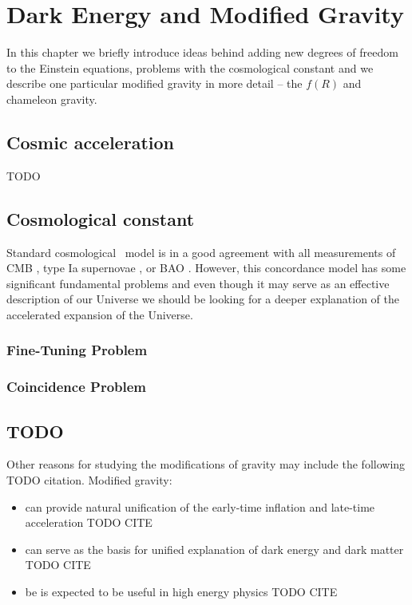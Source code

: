 \chapter{Dark Energy and Modified Gravity}
In this chapter we briefly introduce ideas behind adding new degrees of freedom to the Einstein equations, problems with the cosmological constant and we describe one particular modified gravity in more detail -- the $f(R)$ and chameleon gravity.
\section{Cosmic acceleration}
TODO

\section{Cosmological constant}
Standard cosmological \LCDM\ model is in a good agreement with all measurements of CMB \parencite{collaboration2018planck}, type Ia supernovae \parencite{Abbott_2019}, or BAO \parencite{BAO_results}. However, this concordance model has some significant fundamental problems and even though it may serve as an effective description of our Universe we should be looking for a deeper explanation of the accelerated expansion of the Universe.
\subsection{Fine-Tuning Problem}
\subsection{Coincidence Problem}

\section{TODO}
Other reasons for studying the modifications of gravity may include the following TODO citation. Modified gravity:
\begin{itemize}
	\item can provide natural unification of the early-time inflation and late-time acceleration TODO CITE
	\item can serve as the basis for unified explanation of dark energy and dark matter TODO CITE
	\item be is expected to be useful in high energy physics TODO CITE
\end{itemize}


